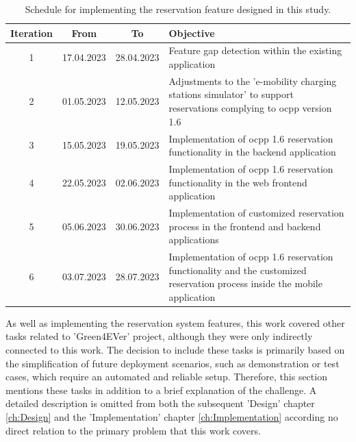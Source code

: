 \begingroup
\setlength{\tabcolsep}{10pt} %
\renewcommand{\arraystretch}{1.5} %
\begin{table}[h]
    \centering
    \caption{Schedule for implementing the reservation feature designed in this study.}
    \begin{tabular}{c|c|c|m{7cm}}
        Iteration & From & To & Objective \\
        \hline
        1 & 17.04.2023 & 28.04.2023 & Feature gap detection within the existing application \\
        2 & 01.05.2023 & 12.05.2023 & Adjustments to the 'e-mobility charging stations simulator' \cite{noauthor_julianhbuechere-mobility-charging-stations-simulator_nodate} to support reservations complying to \acrshort{ocpp} version 1.6 \\
        3 & 15.05.2023 & 19.05.2023 & Implementation of \acrshort{ocpp} 1.6 reservation functionality in the backend application \\
        4 & 22.05.2023 & 02.06.2023 & Implementation of \acrshort{ocpp} 1.6 reservation functionality in the web frontend application \\
        5 & 05.06.2023 & 30.06.2023 & Implementation of customized reservation process in the frontend and backend applications \\
        6 & 03.07.2023 & 28.07.2023 & Implementation of \acrshort{ocpp} 1.6 reservation functionality and the customized reservation process inside the mobile application \\
    \end{tabular}
    \label{tab:development-iterations}
\end{table}
\endgroup

As well as implementing the reservation system features, this work covered other tasks related to 'Green4EVer' \cite{noauthor_hka_nodate} project, although they were only indirectly connected to this work.
The decision to include these tasks is primarily based on the simplification of future deployment scenarios, such as demonstration or test cases, which require an automated and reliable setup.
Therefore, this section mentions these tasks in addition to a brief explanation of the challenge. A detailed description is omitted from both the subsequent 'Design' chapter \ref{ch:Design} and the 'Implementation' chapter \ref{ch:Implementation} according no direct relation to the primary problem that this work covers.


